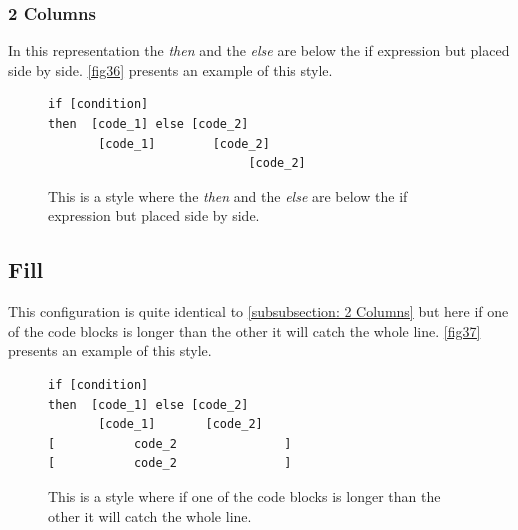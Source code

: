 \subsubsection{2 Columns} \label{subsubsection: 2 Columns}
In this representation the \textit{then} and the \textit{else} are below the if expression but placed side by side. \autoref{fig36} presents an example of this style.
\begin{figure}[H]
\begin{lstlisting}
if [condition]
then  [code_1] else [code_2]
	   [code_1]        [code_2]
				 		    [code_2]
\end{lstlisting}
\caption{This is a style where the \textit{then} and the \textit{else} are below the if expression but placed side by side.}
\label{fig36}
\end{figure}
\subsection{Fill}
This configuration is quite identical to \autoref{subsubsection: 2 Columns} but here if one of the code blocks is longer than the other it will catch the whole line. \autoref{fig37} presents an example of this style.
\begin{figure}[H]
\begin{lstlisting}
if [condition]
then  [code_1] else [code_2]
	   [code_1]       [code_2]
[			code_2			     ]
[			code_2			     ]
\end{lstlisting}
\caption{This is a style where if one of the code blocks is longer than the other it will catch the whole line.}
\label{fig37}
\end{figure}